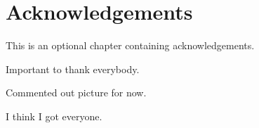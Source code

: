 \chapter*{Acknowledgements}
\label{acknowledgements}

This is an optional chapter containing acknowledgements.

Important to thank everybody.

Commented out picture for now.


I think I got everyone.